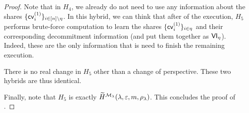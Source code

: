 \begin{proof}
 Note that in $H_4$, we already do not need to use any information about the shares $\{\mathsf{cv}^{(1)}_i\}_{i \in [n] \setminus \eta}$. In this hybrid, we can think that after  of the execution, $H_5$ performs brute-force computation to learn the shares $\{\mathsf{cv}^{(1)}_i\}_{i \in \eta}$ and their corresponding decommitment information (and put them together as $\mathsf{VI}_\eta$). Indeed, these are the only information that is need to finish the remaining execution. 

 There is no real change in $H_5$ other than a change of perspective. These two hybrids are thus identical.

Finally, note that $H_5$ is exactly $\widetilde{H}^{\mathcal{M}_\lambda}(\lambda, \varepsilon, m, \rho_\lambda)$. This concludes the proof of .

\end{proof}

